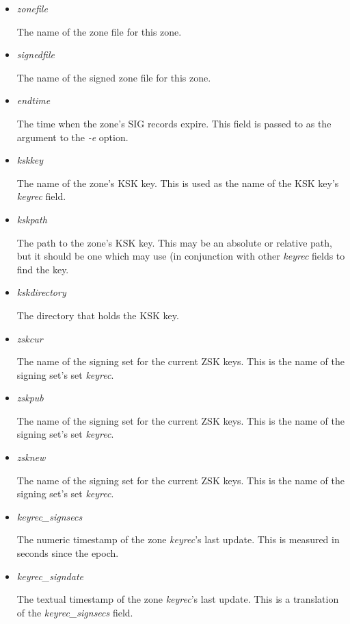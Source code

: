 \begin{itemize}

\item {\it zonefile}

The name of the zone file for this zone.

\item {\it signedfile}

The name of the signed zone file for this zone.

\item {\it endtime}

The time when the zone's SIG records expire.  This field is passed to
 as the argument to the {\it -e} option.

\item {\it kskkey}

The name of the zone's KSK key.  This is used as the name of the KSK key's
{\it keyrec} field.

\item {\it kskpath}

The path to the zone's KSK key.  This may be an absolute or relative path,
but it should be one which  may use (in conjunction with other
{\it keyrec} fields to find the key.

\item {\it kskdirectory}

The directory that holds the KSK key.

\item {\it zskcur}

The name of the signing set for the current ZSK keys.
This is the name of the signing set's set {\it keyrec}.

\item {\it zskpub}

The name of the signing set for the current ZSK keys.
This is the name of the signing set's set {\it keyrec}.

\item {\it zsknew}

The name of the signing set for the current ZSK keys.
This is the name of the signing set's set {\it keyrec}.

\item {\it keyrec\_signsecs}

The numeric timestamp of the zone {\it keyrec}'s last update.
This is measured in seconds since the epoch.

\item {\it keyrec\_signdate}

The textual timestamp of the zone {\it keyrec}'s last update.
This is a translation of the {\it keyrec\_signsecs} field.

\end{itemize}

